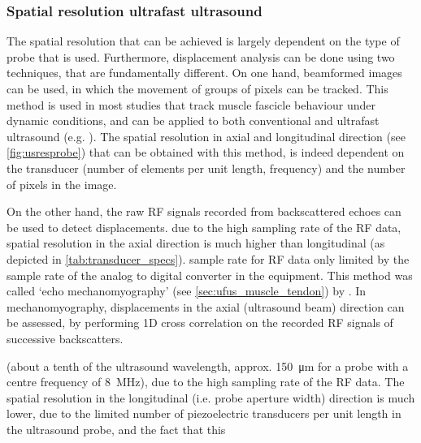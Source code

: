 \subsubsection{Spatial resolution ultrafast ultrasound}
The spatial resolution that can be achieved is largely dependent on the type of probe that is used. Furthermore, displacement analysis can be done using two techniques, that are fundamentally different. On one hand, beamformed images can be used, in which the movement of groups of pixels can be tracked. This method is used in most studies that track muscle fascicle behaviour under dynamic conditions, and can be applied to both conventional and ultrafast ultrasound (e.g. \cite{farris_ultratrack_2016, farcy_interaction_2014, hauraix_muscle_2017, af_klint_sudden_2009, cronin_triceps_2015, cronin_automatic_2011}). The spatial resolution in axial and longitudinal direction (see \autoref{fig:usresprobe}) that can be obtained with this method, is indeed dependent on the transducer (number of elements per unit length, frequency) and the number of pixels in the image. 

\tred[draft:] On the other hand, the raw RF signals recorded from backscattered echoes can be used to detect displacements.  due to the high sampling rate of the RF data, spatial resolution in the axial direction is much higher than longitudinal (as depicted in \autoref{tab:transducer_specs}). sample rate for RF data only limited by the sample rate of the analog to digital converter in the equipment. This method was called `echo mechanomyography' (see \autoref{sec:ufus_muscle_tendon}) by \citet{deffieux_assessment_2008}. In mechanomyography, \tred[only] displacements in the axial (ultrasound beam) direction can be assessed, by performing 1D cross correlation on the recorded RF signals of successive backscatters. 

(about a tenth of the ultrasound wavelength, approx. \SI{150}{\micro\meter} for a probe with a centre frequency of \SI{8}{\mega\hertz}), due to the high sampling rate of the RF data. The spatial resolution in the longitudinal (i.e. probe aperture width) direction is much lower, due to the limited number of piezoelectric transducers per unit length in the ultrasound probe, and the fact that this 

